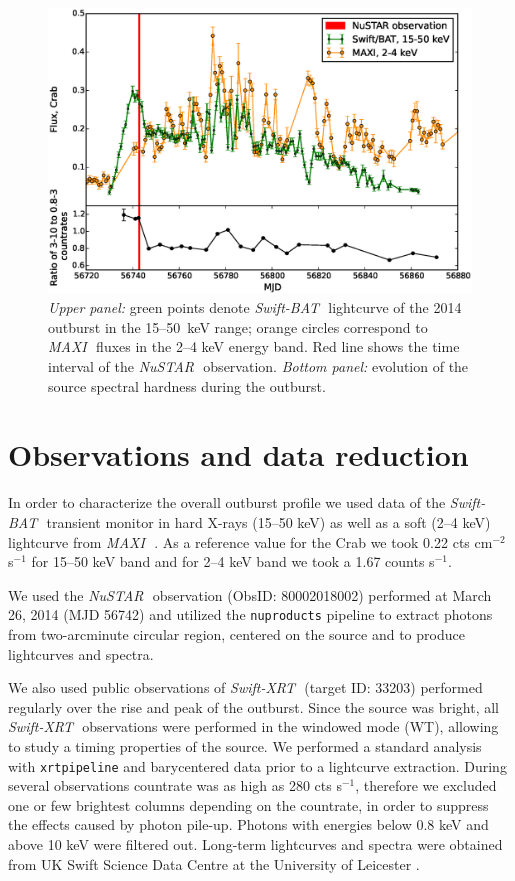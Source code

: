 \documentclass[a4paper,fleqn,usenatbib]{mnras}
\def\swiftx{{\em Swift-XRT\,}}
\def\swiftb{{\em Swift-BAT\,}}
\def\nustar{{\em NuSTAR\,}}
\def\maxi{{\em MAXI\,}}
\begin{document}
\begin{figure}
\centerline{\includegraphics[scale=0.5]{batlc_v06.eps}}
\caption{{\it Upper panel:} green points denote \swiftb\, lightcurve of the 2014 outburst in the 15--50~keV range; orange circles correspond to \maxi\, fluxes in the 2--4 keV energy band.  
Red line shows the time interval of the \nustar\, observation. 
{\it Bottom panel:} evolution of the source spectral hardness during the outburst.} 
\label{fig:batlc}
\end{figure} 

\section{Observations and data reduction}
\label{sec:datared} 
In order to characterize the overall outburst profile we used data of the \swiftb\, transient monitor \citep{krimm13bat} in hard X-rays (15--50 keV) as well as a soft (2--4 keV) lightcurve from \maxi\, \citep{matsuoka13maxi}.  As a reference value for the Crab we took 0.22 cts cm$^{-2}$ s$^{-1}$ for 15--50 keV band and for 2--4 keV band we took a 1.67 counts s$^{-1}$.

We used the \nustar\, observation (ObsID: 80002018002) performed at March 26, 2014 (MJD 56742) and utilized the {\texttt{nuproducts}} pipeline to extract photons from two-arcminute circular region, centered on the source and to produce lightcurves and spectra.

We also used public observations of \swiftx\, (target ID: 33203) performed regularly over the rise and peak of the outburst.  
Since the source was bright, all \swiftx\, observations were performed in the windowed mode (WT), allowing to study a timing properties of the source. 
We performed a standard analysis with {\texttt{xrtpipeline}} and barycentered data prior to a lightcurve extraction. 
During several observations countrate was as high as 280 cts s$^{-1}$, therefore we excluded one or few brightest columns depending on the countrate, in order to suppress the effects caused by photon pile-up. 
Photons with energies below 0.8 keV and above 10 keV were filtered out. 
Long-term lightcurves and spectra were obtained from UK Swift Science Data Centre at the University of Leicester \citep{evans09}.
\end{document}
